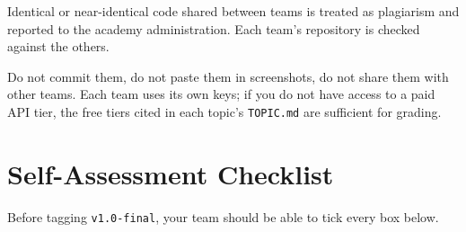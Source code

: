 \documentclass[11pt,a4paper]{article}
\begin{document}
Identical or near-identical code shared between teams is treated as plagiarism and reported to the academy administration. Each team's repository is checked against the others.

\begin{warnbox}
Do not commit them, do not paste them in screenshots, do not share them with other teams. Each team uses its own keys; if you do not have access to a paid API tier, the free tiers cited in each topic's \texttt{TOPIC.md} are sufficient for grading.
\end{warnbox}

\section{Self-Assessment Checklist}\label{sec:selfcheck}
Before tagging \texttt{v1.0-final}, your team should be able to tick every box below.
\end{document}
